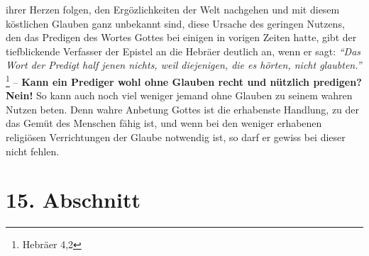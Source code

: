 ihrer Herzen folgen, den Ergözlichkeiten der Welt nachgehen und mit diesem
köstlichen Glauben ganz unbekannt sind, diese Ursache des geringen Nutzens, den
das Predigen  des Wortes Gottes bei einigen in vorigen Zeiten
hatte, gibt der
tiefblickende Verfasser der Epistel an die Hebräer
deutlich an, wenn er sagt:
\textit{"`Das Wort der Predigt half jenen nichts, weil
diejenigen, die es hörten, nicht glaubten."'}
\footnote{Hebräer 4,2}
\label{ref:06_14_predigt}
-- \textbf{Kann
ein
Prediger wohl ohne Glauben recht und nützlich predigen? Nein!} So kann auch noch
viel weniger jemand ohne Glauben zu seinem wahren Nutzen beten. Denn wahre
Anbetung Gottes ist die erhabenste Handlung, zu der das Gemüt des Menschen fähig
ist, und wenn bei den weniger erhabenen religiösen Verrichtungen der Glaube
notwendig ist, so darf er gewiss bei dieser nicht fehlen.

\section{15. Abschnitt} \label{kap6_ab15}

